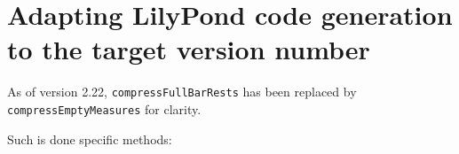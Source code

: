\section{Adapting LilyPond code generation to the target version number}

As of version 2.22, {\tt compressFullBarRests} has been replaced by {\tt compressEmptyMeasures} for clarity.

Such is done specific methods:
\begin{lstlisting}[language=CPlusPlus]

\end{lstlisting}
